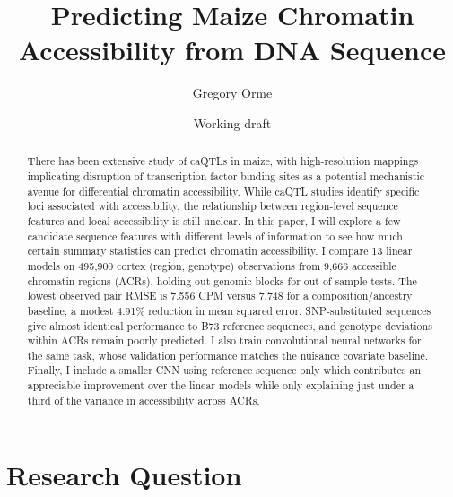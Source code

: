 \documentclass[10pt]{article}
\title{\textbf{Predicting Maize Chromatin Accessibility from DNA Sequence}}
\author{Gregory Orme}
\date{Working draft}
\begin{document}
\maketitle

\begin{abstract}
There has been extensive study of caQTLs in maize, with high-resolution mappings implicating disruption of transcription factor binding sites as a potential mechanistic avenue for differential chromatin accessibility. While caQTL studies identify specific loci associated with accessibility, the relationship between region-level sequence features and local accessibility is still unclear. In this paper, I will explore a few candidate sequence features with different levels of information to see how much certain summary statistics can predict chromatin accessibility. I compare 13 linear models on 495,900 cortex (region, genotype) observations from 9,666 accessible chromatin regions (ACRs), holding out genomic blocks for out of sample tests. The lowest observed pair RMSE is 7.556 CPM versus 7.748 for a composition/ancestry baseline, a modest 4.91\% reduction in mean squared error. SNP-substituted sequences give almost identical performance to B73 reference sequences, and genotype deviations within ACRs remain poorly predicted. I also train convolutional neural networks for the same task, whose validation performance matches the nuisance covariate baseline. Finally, I include a smaller CNN using reference sequence only which contributes an appreciable improvement over the linear models while only explaining just under a third of the variance in accessibility across ACRs.
\end{abstract}

\section{Research Question}
\end{document}
